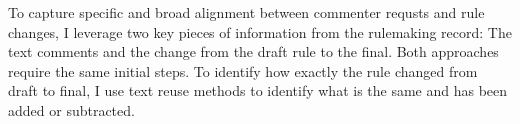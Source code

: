 To capture specific and broad alignment between commenter requsts and rule changes, I leverage two key pieces of information from the rulemaking record: The text comments and the change from the draft rule to the final. %
Both approaches require the same initial steps. To identify how exactly the rule changed from draft to final, I use text reuse methods to identify what is the same and has been added or subtracted. 






